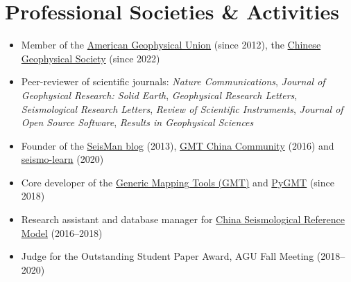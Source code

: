 \section{Professional Societies \& Activities}

\begin{itemize}
\item Member of the \href{https://sites.agu.org/}{American Geophysical Union} (since 2012),
      the \href{http://www.cgscgs.org.cn/}{Chinese Geophysical Society} (since 2022)
\item Peer-reviewer of scientific journals:
      \emph{Nature Communications},
      \emph{Journal of Geophysical Research: Solid Earth},
      \emph{Geophysical Research Letters},
      \emph{Seismological Research Letters},
      \emph{Review of Scientific Instruments},
      \emph{Journal of Open Source Software},
      \emph{Results in Geophysical Sciences}
\item Founder of the \href{https://blog.seisman.info}{SeisMan blog} (2013),
      \href{http://gmt-china.org/}{GMT China Community} (2016)
      and \href{https://seismo-learn.org/}{seismo-learn} (2020)
\item Core developer of the \href{https://github.com/GenericMappingTools/gmt}{Generic Mapping Tools (GMT)} and
      \href{https://github.com/GenericMappingTools/pygmt}{PyGMT} (since 2018)
\item Research assistant and database manager for \href{http://chinageorefmodel.org/}{China Seismological Reference Model} (2016--2018)
\item Judge for the Outstanding Student Paper Award, AGU Fall Meeting (2018--2020)
\end{itemize}
